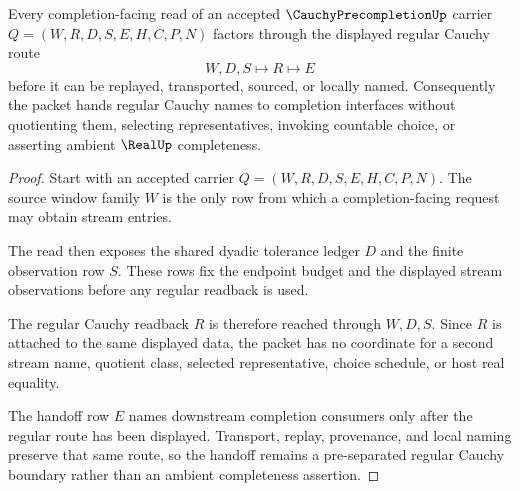 \begin{theorem}
\label{thm:cauchy-precompletion-regular-handoff}
Every completion-facing read of an accepted $\CauchyPrecompletionUp$ carrier $Q=(W,R,D,S,E,H,C,P,N)$ factors through the displayed regular Cauchy route
$$
W,D,S \longmapsto R \longmapsto E
$$
before it can be replayed, transported, sourced, or locally named. Consequently the packet hands regular Cauchy names to completion interfaces without quotienting them, selecting representatives, invoking countable choice, or asserting ambient $\RealUp$ completeness.
\end{theorem}
\begin{proof}
Start with an accepted carrier $Q=(W,R,D,S,E,H,C,P,N)$. The source window family $W$ is the only row from which a completion-facing request may obtain stream entries.

The read then exposes the shared dyadic tolerance ledger $D$ and the finite observation row $S$. These rows fix the endpoint budget and the displayed stream observations before any regular readback is used.

The regular Cauchy readback $R$ is therefore reached through $W,D,S$. Since $R$ is attached to the same displayed data, the packet has no coordinate for a second stream name, quotient class, selected representative, choice schedule, or host real equality.

The handoff row $E$ names downstream completion consumers only after the regular route has been displayed. Transport, replay, provenance, and local naming preserve that same route, so the handoff remains a pre-separated regular Cauchy boundary rather than an ambient completeness assertion.
\end{proof}

